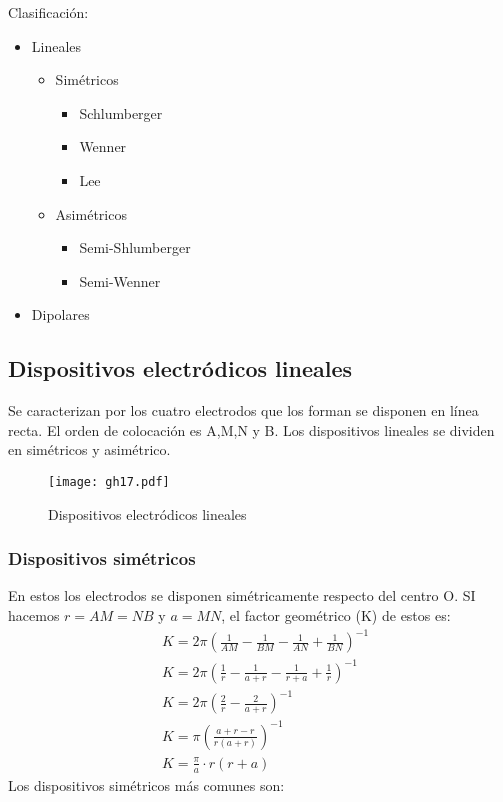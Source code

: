 Clasificación:
\begin{itemize}
  \item Lineales \begin{itemize}
    \item Simétricos \begin{itemize}
      \item Schlumberger
      \item Wenner
      \item Lee
    \end{itemize}
    \item Asimétricos \begin{itemize}
      \item Semi-Shlumberger
      \item Semi-Wenner
    \end{itemize}
  \end{itemize}
  \item Dipolares
\end{itemize}
\subsection{Dispositivos electródicos lineales}
Se caracterizan por los cuatro electrodos que los forman se disponen en línea recta. El orden de colocación es A,M,N y B. Los dispositivos lineales se dividen en simétricos y asimétrico.
\begin{figure}[h!]
\centering
  \texttt{[image: gh17.pdf]}
  \caption{Dispositivos electródicos lineales}
  \label{gh17}
\end{figure}
\subsubsection{Dispositivos simétricos}
En estos los electrodos se disponen simétricamente respecto del centro O. SI hacemos $r=AM=NB$ y $a=MN$, el factor geométrico (K) de estos es:
\begin{align*}
  &K = 2\pi\left(\frac{1}{AM} - \frac{1}{BM} - \frac{1}{AN} + \frac{1}{BN}\right)^{- 1}\\
  &K = 2\pi\left(\frac{1}{r} -\frac{1}{a+ r} - \frac{1}{r+ a} + \frac{1}{r}\right)^{- 1}\\
  &K = 2\pi\left(\frac{2}{r} - \frac{2}{a + r} \right)^{ - 1}\\
  &K = \pi\left(\frac{a + r - r}{r(a + r)}\right)^{ - 1 }\\
  &K = \frac{\pi}{a} \cdot r\left(r + a\right)
\end{align*}
Los dispositivos simétricos más comunes son:
